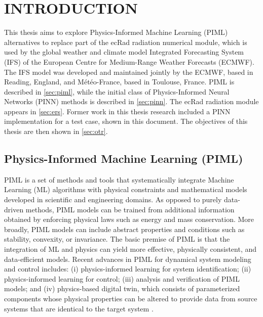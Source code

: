 \chapter{INTRODUCTION}
\label{ch:intr}

This thesis aims to explore Physics-Informed Machine Learning (PIML) alternatives to replace part of the ecRad radiation numerical module, which is used by the global weather and climate model Integrated Forecasting System (IFS) of the European Centre for Medium-Range Weather Forecasts (ECMWF). The IFS model was developed and maintained jointly by the ECMWF, based in Reading, England, and Météo-France, based in Toulouse, France. PIML is described in \autoref{sec:piml}, while the initial class of Physics-Informed Neural Networks (PINN) methods is described in \autoref{sec:pinn}. The ecRad radiation module appears in \autoref{sec:ers}. Former work in this thesis research included a PINN implementation for a test case, shown in this document. The objectives of this thesis are then shown in \autoref{sec:otr}.

\section{Physics-Informed Machine Learning (PIML) }
\label{sec:piml}

PIML is a set of methods and tools that systematically integrate Machine Learning (ML) algorithms with physical constraints and mathematical models developed in scientific and engineering domains. As opposed to purely data-driven methods, PIML models can be trained from additional information obtained by enforcing physical laws such as energy and mass conservation. More broadly, PIML models can include abstract properties and conditions such as stability, convexity, or invariance. The basic premise of PIML is that the integration of ML and physics can yield more effective, physically consistent, and data-efficient models. Recent advances in PIML for dynamical system modeling and control includes: (i) physics-informed learning for system identification; (ii) physics-informed learning for control; (iii) analysis and verification of PIML models; and (iv) physics-based digital twin, which consists of parameterized components whose physical properties can be altered to provide data from source systems that are identical to the target system
\cite{Nghiem2023}.

